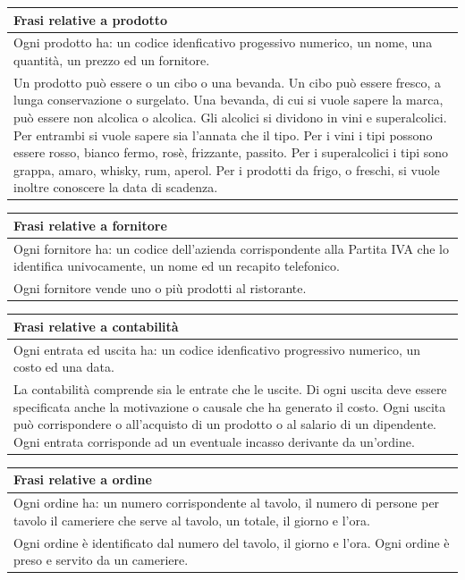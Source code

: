 \begin{longtable}{|p{15.5cm}|}
    \hline
    \textbf{Frasi relative a prodotto} \\ \hline
    Ogni prodotto ha: un codice idenficativo progessivo numerico, un nome, una quantità, un prezzo ed un fornitore.\\
    Un prodotto può essere o un cibo o una bevanda.
    Un cibo può essere fresco, a lunga conservazione o surgelato.
    Una bevanda, di cui si vuole sapere la marca, può essere non alcolica o alcolica. Gli
    alcolici si dividono in vini e superalcolici. Per entrambi si vuole sapere sia l’annata che
    il tipo.
    Per i vini i tipi possono essere rosso, bianco fermo, rosè, frizzante, passito. Per i
    superalcolici i tipi sono grappa, amaro, whisky, rum, aperol.
    Per i prodotti da frigo, o freschi, si vuole inoltre conoscere la data di scadenza.\\ \hline
\end{longtable}

\begin{longtable}{|p{15.5cm}|}
    \hline
    \textbf{Frasi relative a fornitore} \\ \hline
    Ogni fornitore ha: un codice dell'azienda corrispondente alla Partita IVA che lo identifica univocamente, un nome ed un recapito telefonico.\\
    Ogni fornitore vende uno o più prodotti al ristorante.
    \\ \hline
\end{longtable}

\begin{longtable}{|p{15.5cm}|}
    \hline
    \textbf{Frasi relative a contabilità} \\ \hline
    Ogni entrata ed uscita ha: un codice idenficativo progressivo numerico, un costo ed una data.\\
    La contabilità comprende sia le entrate che le uscite.
    Di ogni uscita deve essere specificata anche la motivazione o causale che ha generato
    il costo.
    Ogni uscita può corrispondere o all’acquisto di un prodotto o al salario di un dipendente.
    Ogni entrata corrisponde ad un eventuale incasso derivante da un’ordine.
    \\ \hline
\end{longtable}

\begin{longtable}{|p{15.5cm}|}
    \hline
    \textbf{Frasi relative a ordine} \\ \hline
    Ogni ordine ha: un numero corrispondente al tavolo, il numero di persone per tavolo il cameriere che serve al tavolo, un totale, il giorno e l'ora. \\
    Ogni ordine è identificato dal numero del tavolo, il giorno e l’ora.
    Ogni ordine è preso e servito da un cameriere.
    \\ \hline
\end{longtable}

